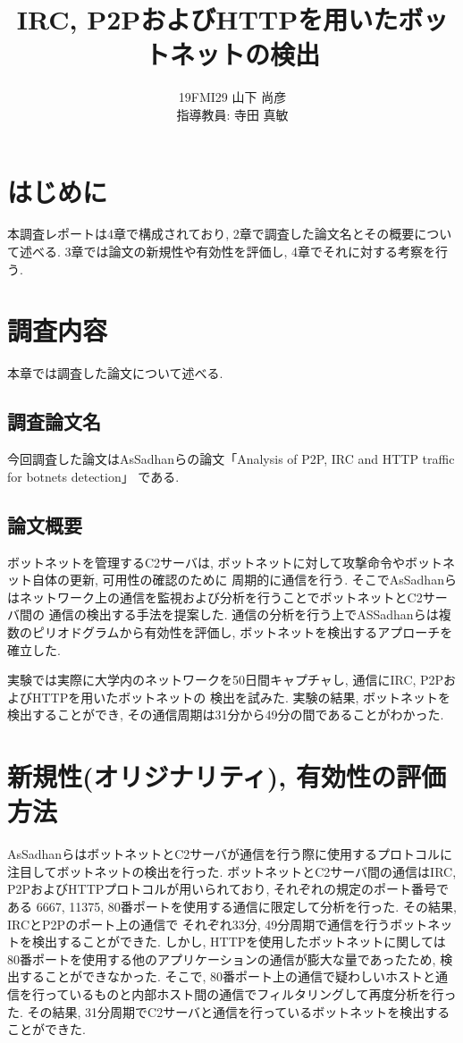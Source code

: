 \documentclass[twocolumn,9]{ltjsarticle}
\title{IRC, P2PおよびHTTPを用いたボットネットの検出}
\author{19FMI29 山下 尚彦 \\ 指導教員: 寺田 真敏}
\date{}
\begin{document}
\maketitle

\section{はじめに}
本調査レポートは4章で構成されており, 2章で調査した論文名とその概要について述べる. 
3章では論文の新規性や有効性を評価し, 4章でそれに対する考察を行う. 

\section{調査内容}
本章では調査した論文について述べる. 

\subsection{調査論文名}
今回調査した論文はAsSadhanらの論文「Analysis of P2P, IRC and HTTP traffic for botnets detection」
\cite{assadhan2018analysis}である. 

\subsection{論文概要}
ボットネットを管理するC2サーバは, ボットネットに対して攻撃命令やボットネット自体の更新, 可用性の確認のために
周期的に通信を行う. そこでAsSadhanらはネットワーク上の通信を監視および分析を行うことでボットネットとC2サーバ間の
通信の検出する手法を提案した. 通信の分析を行う上でASSadhanらは複数のピリオドグラムから有効性を評価し, 
ボットネットを検出するアプローチを確立した. 

実験では実際に大学内のネットワークを50日間キャプチャし, 通信にIRC, P2PおよびHTTPを用いたボットネットの
検出を試みた. 実験の結果, ボットネットを検出することができ, その通信周期は31分から49分の間であることがわかった. 

\section{新規性(オリジナリティ), 有効性の評価方法}
AsSadhanらはボットネットとC2サーバが通信を行う際に使用するプロトコルに注目してボットネットの検出を行った. 
ボットネットとC2サーバ間の通信はIRC, P2PおよびHTTPプロトコルが用いられており, それぞれの規定のポート番号である
6667, 11375, 80番ポートを使用する通信に限定して分析を行った. その結果, IRCとP2Pのポート上の通信で
それぞれ33分, 49分周期で通信を行うボットネットを検出することができた. しかし, HTTPを使用したボットネットに関しては
80番ポートを使用する他のアプリケーションの通信が膨大な量であったため, 検出することができなかった. 
そこで, 80番ポート上の通信で疑わしいホストと通信を行っているものと内部ホスト間の通信でフィルタリングして再度分析を行った. 
その結果, 31分周期でC2サーバと通信を行っているボットネットを検出することができた. 
\end{document}
